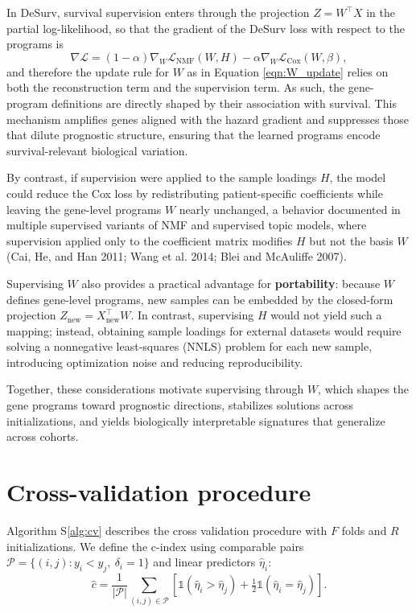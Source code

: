 \documentclass[
]{article}
\begin{document}
In DeSurv, survival supervision enters through the projection
\(Z = W^\top X\) in the partial log-likelihood, so that the gradient of
the DeSurv loss with respect to the programs is \[
\nabla \mathcal{L} = (1-\alpha) \nabla_W \mathcal{L}_{\mathrm{NMF}}(W,H) - \alpha\nabla_W \mathcal{L}_{\mathrm{Cox}}(W,\beta),
\] and therefore the update rule for \(W\) as in Equation
\ref{eqn:W_update} relies on both the reconstruction term and the
supervision term. As such, the gene-program definitions are directly
shaped by their association with survival. This mechanism amplifies
genes aligned with the hazard gradient and suppresses those that dilute
prognostic structure, ensuring that the learned programs encode
survival-relevant biological variation.

By contrast, if supervision were applied to the sample loadings \(H\),
the model could reduce the Cox loss by redistributing patient-specific
coefficients while leaving the gene-level programs \(W\) nearly
unchanged, a behavior documented in multiple supervised variants of NMF
and supervised topic models, where supervision applied only to the
coefficient matrix modifies \(H\) but not the basis \(W\) (Cai, He, and
Han 2011; Wang et al. 2014; Blei and McAuliffe 2007).

Supervising \(W\) also provides a practical advantage for
\textbf{portability}: because \(W\) defines gene-level programs, new
samples can be embedded by the closed-form projection
\(Z_{\text{new}} = X_{\text{new}}^\top W\). In contrast, supervising
\(H\) would not yield such a mapping; instead, obtaining sample loadings
for external datasets would require solving a nonnegative least-squares
(NNLS) problem for each new sample, introducing optimization noise and
reducing reproducibility.

Together, these considerations motivate supervising through \(W\), which
shapes the gene programs toward prognostic directions, stabilizes
solutions across initializations, and yields biologically interpretable
signatures that generalize across cohorts.

\section{Cross-validation procedure}

Algorithm S\ref{alg:cv} describes the cross validation procedure with
\(F\) folds and \(R\) initializations. We define the c-index using
comparable pairs \(\mathcal{P} = \{(i,j) : y_i < y_j,\ \delta_i = 1\}\)
and linear predictors \(\hat{\eta}_i\): \begin{equation}
\label{eqn:cindex}
\hat{c} =
\frac{1}{|\mathcal{P}|}
\sum_{(i,j)\in\mathcal{P}}
\left[
  \mathbb{1}(\hat{\eta}_i > \hat{\eta}_j)
  + \tfrac{1}{2}\mathbb{1}(\hat{\eta}_i = \hat{\eta}_j)
\right].
\end{equation}
\end{document}
